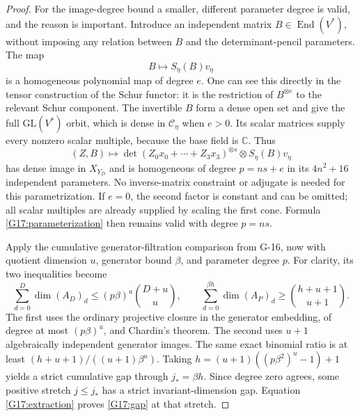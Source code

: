 \begin{proof}
For the image-degree bound a smaller, different parameter degree
is valid, and the reason is important. Introduce an independent
matrix $B\in\operatorname{End}(V^*)$, without imposing any relation
between $B$ and the determinant-pencil parameters. The map
\[
 B\longmapsto S_\eta(B)v_\eta
\]
is a homogeneous polynomial map of degree $e$. One can see this
directly in the tensor construction of the Schur functor: it is
the restriction of $B^{\otimes e}$ to the relevant Schur component.
The invertible $B$ form a dense open set and give the full
$\mathrm{GL}(V^*)$ orbit, which is dense in $\mathcal C_\eta$
when $e>0$. Its scalar matrices supply every nonzero scalar
multiple, because the base field is $\mathbb C$.
Thus
\begin{equation}\label{G17:parameterization}
 (Z,B)\longmapsto
  \det(Z_0x_0+\cdots+Z_3x_3)^{\otimes s}
       \otimes S_\eta(B)v_\eta
\end{equation}
has dense image in $X_{Y_D}$ and is homogeneous of degree
$p=ns+e$ in its $4n^2+16$ independent parameters.
No inverse-matrix constraint or adjugate is needed for this
parametrization. If $e=0$, the second factor is constant and can
be omitted; all scalar multiples are already supplied by scaling
the first cone. Formula \eqref{G17:parameterization} then remains
valid with degree $p=ns$.

Apply the cumulative generator-filtration comparison from G-16,
now with quotient dimension $u$, generator bound $\beta$, and
parameter degree $p$. For clarity, its two inequalities become
\[
 \sum_{d=0}^{D}\dim(A_D)_d
       \leq(p\beta)^u\binom{D+u}{u},\qquad
 \sum_{d=0}^{\beta h}\dim(A_P)_d
       \geq\binom{h+u+1}{u+1}.
\]
The first uses the ordinary projective closure in the generator
embedding, of degree at most $(p\beta)^u$, and Chardin's theorem.
The second uses $u+1$ algebraically independent generator images.
The same exact binomial ratio is at least
$(h+u+1)/((u+1)\beta^u)$. Taking
$h=(u+1)((p\beta^2)^u-1)+1$ yields a strict cumulative gap through
$j_*=\beta h$. Since degree zero agrees, some positive stretch
$j\leq j_*$ has a strict invariant-dimension gap. Equation
\eqref{G17:extraction} proves \eqref{G17:gap} at that stretch.


\end{proof}
